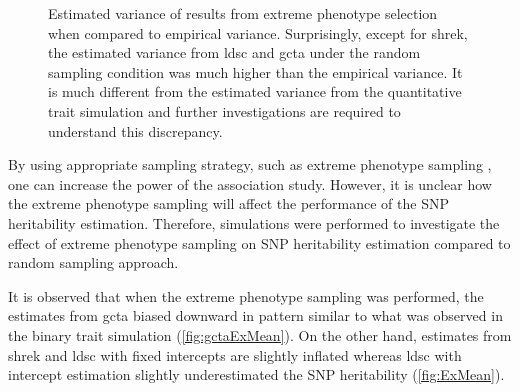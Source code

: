 \documentclass[12pt]{scrbook}
\begin{document}
\begin{figure}
{		
		\label{fig:ldscInExVarCom}
	}
	\caption[Estimation of Variance in Extreme Phenotype Selection]
	{Estimated variance of results from extreme phenotype selection when compared to empirical variance.
		Surprisingly, except for \gls{shrek}, the estimated variance from \gls{ldsc} and \gls{gcta} under the random sampling condition was much higher than the empirical variance. 
		It is much different from the estimated variance from the quantitative trait simulation and further investigations are required to understand this discrepancy.
	} 
	\label{fig:ExVarCom}
\end{figure}

By using appropriate sampling strategy, such as extreme phenotype sampling \citep{Peloso2015}, one can increase the power of the association study.
However, it is unclear how the extreme phenotype sampling will affect the performance of the \gls{SNP} heritability estimation.
Therefore, simulations were performed to investigate the effect of extreme phenotype sampling on \gls{SNP} heritability estimation compared to random sampling approach. 

It is observed that when the extreme phenotype sampling was performed, the estimates from \gls{gcta} biased downward in pattern similar to what was observed in the binary trait simulation (\cref{fig:gctaExMean}).
On the other hand, estimates from \gls{shrek} and \gls{ldsc} with fixed intercepts are slightly inflated whereas \gls{ldsc} with intercept estimation slightly underestimated the \gls{SNP} heritability (\cref{fig:ExMean}).
\end{document}
